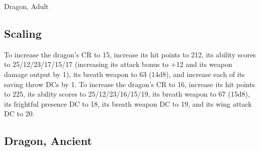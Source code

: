 \begin{DndMonster}[float*=b,width=\textwidth + 8pt]{Dragon, Adult}
\begin{multicols}{2}
\subsection{Scaling}
To increase the dragon's CR to 15, increase its hit points to 212, its ability scores to 25/12/23/17/15/17 (increasing its attack bonus to +12 and its weapon damage output by 1), its breath weapon to 63 (14d8), and increase each of its saving throw DCs by 1.
To increase the dragon's CR to 16, increase its hit points to 225, its ability scores to 25/12/23/16/15/19, its breath weapon to 67 (15d8), its frightful presence DC to 18, its breath weapon DC to 19, and its wing attack DC to 20.
\end{multicols}
\end{DndMonster}
\subsection{Dragon, Ancient}
